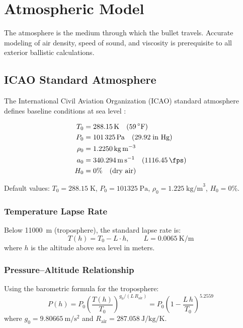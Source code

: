 \documentclass[11pt,twoside,openright]{report}
\newcommand{\degF}{{}^{\circ}\mathrm{F}}
\begin{document}
\chapter{Atmospheric Model}
\label{ch:atmosphere}

The atmosphere is the medium through which the bullet travels. Accurate modeling of air density, speed of sound, and viscosity is prerequisite to all exterior ballistic calculations.

\section{ICAO Standard Atmosphere}

The International Civil Aviation Organization (ICAO) standard atmosphere defines baseline conditions at sea level \citep{icao1993manual}:

\begin{align}
  T_0 &= \SI{288.15}{\kelvin} \quad (59\,\degF) \\
  P_0 &= \SI{101325}{\pascal} \quad (29.92\;\text{in Hg}) \\
  \rho_0 &= \SI{1.2250}{\kilogram\per\meter\cubed} \\
  a_0 &= \SI{340.294}{\meter\per\second} \quad (\SI{1116.45}{\fps}) \\
  H_0 &= 0\% \quad \text{(dry air)}
\end{align}

Default values: $T_0 = 288.15\;\text{K}$, $P_0 = 101325\;\text{Pa}$, $\rho_0 = 1.225\;\text{kg/m}^3$, $H_0 = 0\%$.

\subsection{Temperature Lapse Rate}

Below \SI{11000}{\meter} (troposphere), the standard lapse rate is:
\begin{equation}
  T(h) = T_0 - L \cdot h, \qquad L = \SI{0.0065}{\kelvin\per\meter}
  \label{eq:lapse}
\end{equation}
where $h$ is the altitude above sea level in meters.

\subsection{Pressure--Altitude Relationship}

Using the barometric formula for the troposphere:
\begin{equation}
  P(h) = P_0 \left(\frac{T(h)}{T_0}\right)^{g_0/(L\,R_{\mathrm{air}})}
  = P_0 \left(1 - \frac{L\,h}{T_0}\right)^{5.2559}
  \label{eq:pressure_altitude}
\end{equation}
where $g_0 = \SI{9.80665}{\meter\per\second\squared}$ and $R_{\mathrm{air}} = \SI{287.058}{\joule\per\kilogram\per\kelvin}$.
\end{document}
